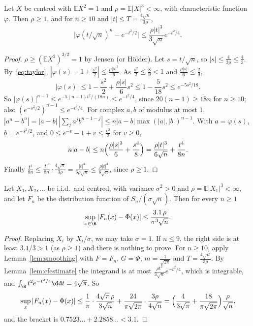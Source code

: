 \begin{lemma}\label{lem:cfestimate}
Let $X$ be centred with $\mathbb EX^2=1$ and $\rho=\mathbb E|X|^3<\infty$, with characteristic function $\varphi$. Then $\rho\ge1$, and for $n\ge10$ and
$|t|\le T=\frac{4\sqrt n}{3\rho}$,
\[
\bigl|\varphi(t/\sqrt n)^n-e^{-t^2/2}\bigr|\le\frac{\rho|t|^3}{3\sqrt n}e^{-t^2/4}.
\]
\end{lemma}
\begin{proof}
$\rho\ge(\mathbb EX^2)^{3/2}=1$ by Jensen (or H\"older). Let $s=t/\sqrt n$, so $|s|\le\frac4{3\rho}\le\frac43$. By~\eqref{eq:taylor}, $|\varphi(s)-1+\frac{s^2}2|\le\frac{\rho|s|^3}6$.
As $\frac{s^2}2\le\frac89<1$ and $\frac{\rho|s|}6\le\frac29$,
\[
|\varphi(s)|\le1-\frac{s^2}2+\frac{\rho|s|}6s^2\le1-\frac5{18}s^2\le e^{-5s^2/18}.
\]
So $|\varphi(s)|^{n-1}\le e^{-5(n-1)t^2/(18n)}\le e^{-t^2/4}$, since $20(n-1)\ge18n$ for $n\ge10$; also $(e^{-s^2/2})^{n-1}\le e^{-t^2/4}$. For complex $a,b$ of
modulus at most $1$, $|a^n-b^n|=|a-b|\,|\sum_ja^jb^{n-1-j}|\le n|a-b|\max(|a|,|b|)^{n-1}$. With $a=\varphi(s)$, $b=e^{-s^2/2}$, and $0\le e^{-v}-1+v\le\frac{v^2}2$
for $v\ge0$,
\[
n|a-b|\le n\Bigl(\frac{\rho|s|^3}6+\frac{s^4}8\Bigr)=\frac{\rho|t|^3}{6\sqrt n}+\frac{t^4}{8n}.
\]
Finally $\frac{t^4}{8n}\le\frac{|t|^3}{8n}\cdot\frac{4\sqrt n}{3\rho}=\frac{|t|^3}{6\rho\sqrt n}\le\frac{\rho|t|^3}{6\sqrt n}$, since $\rho\ge1$.
\end{proof}

\begin{theorem}\label{thm:berryesseen}
Let $X_1,X_2,\dots$ be i.i.d.\ and centred, with variance $\sigma^2>0$ and $\rho=\mathbb E|X_1|^3<\infty$, and let $F_n$ be the distribution function of
$S_n/(\sigma\sqrt n)$. Then for every $n\ge1$
\[
\sup_{x\in\R}|F_n(x)-\Phi(x)|\le\frac{3.1\,\rho}{\sigma^3\sqrt n}.
\]
\end{theorem}
\begin{proof}
Replacing $X_i$ by $X_i/\sigma$, we may take $\sigma=1$. If $n\le9$, the right side is at least $3.1/3>1$ (as $\rho\ge1$) and there is nothing to prove.
For $n\ge10$, apply Lemma~\ref{lem:smoothing} with $F=F_n$, $G=\Phi$, $m=\frac1{\sqrt{2\pi}}$ and $T=\frac{4\sqrt n}{3\rho}$. By Lemma~\ref{lem:cfestimate} the
integrand is at most $\frac{\rho t^2}{3\sqrt n}e^{-t^2/4}$, which is integrable, and $\int_\R t^2e^{-t^2/4}\dd t=4\sqrt\pi$. So
\[
\sup_x|F_n(x)-\Phi(x)|\le\frac1\pi\cdot\frac{4\sqrt\pi\,\rho}{3\sqrt n}+\frac{24}{\pi\sqrt{2\pi}}\cdot\frac{3\rho}{4\sqrt n}=\Bigl(\frac4{3\sqrt\pi}+\frac{18}{\pi\sqrt{2\pi}}\Bigr)\frac\rho{\sqrt n},
\]
and the bracket is $0.7523\ldots+2.2858\ldots<3.1$.
\end{proof}

